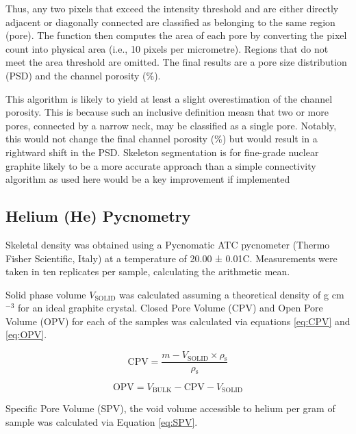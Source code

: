 \documentclass[3p,twocolumn]{elsarticle}
\begin{document}
Thus, any two pixels that exceed the intensity threshold and are either directly
adjacent or diagonally connected are classified as belonging to the same region
(pore). The function then computes the area of each pore by converting the pixel
count into physical area (i.e., 10 pixels per micrometre). Regions that do not
meet the area threshold are omitted. The final results are a pore size
distribution (PSD) and the channel porosity (\%).

This algorithm is likely to yield at least a  slight overestimation of the
channel porosity. This is because such an inclusive definition measn that two or
more pores, connected by a narrow neck, may be classified as a single pore.
Notably, this would not change the final channel porosity (\%) but would result
in a rightward shift in the PSD. Skeleton segmentation is for fine-grade nuclear
graphite likely to be a more accurate approach than a simple connectivity
algorithm as used here would be a key improvement if implemented
\cite{ARREGUIMENA2022112047}


\subsection{Helium (He) Pycnometry}
	
Skeletal density was obtained using a Pycnomatic ATC pycnometer (Thermo Fisher
Scientific, Italy) at a temperature of 20.00 ± 0.01\textdegree{}C. Measurements
were taken in ten replicates per sample, calculating the arithmetic mean.

Solid phase volume $V_{\mathrm{SOLID}}$ was calculated assuming a theoretical
density of  g cm$^{-3}$ for an ideal
graphite crystal. Closed Pore Volume (CPV) and Open Pore Volume (OPV) for each
of the samples was calculated via equations \ref{eq:CPV} and \ref{eq:OPV}.

\begin{equation}
\mathrm{CPV} = \frac{m - V_{\mathrm{SOLID}} \times \rho{_\mathrm{s}}}{\rho{_\mathrm{s}}} 	\label{eq:CPV} 
\end{equation}

\begin{equation}
	\mathrm{OPV} = V_{\mathrm{BULK}} - \mathrm{CPV} - V_{\mathrm{SOLID}}\label{eq:OPV} 
\end{equation}

Specific Pore Volume (SPV), the void volume accessible to helium per gram of
sample was calculated via Equation \ref{eq:SPV}. 
\end{document}
